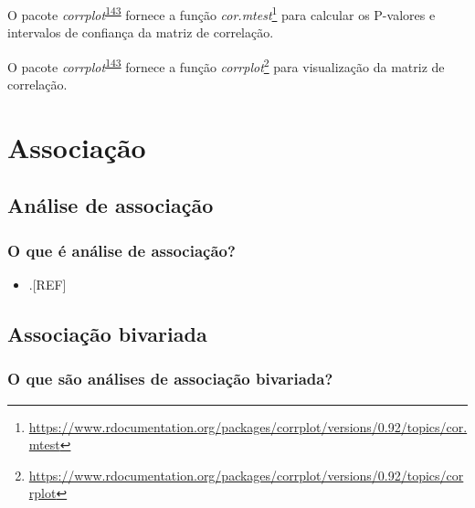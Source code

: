 \documentclass[
  a4paper,
]{book}
\providecommand{\tightlist}{%
  \setlength{\itemsep}{0pt}\setlength{\parskip}{0pt}}
\renewcommand{\href}[2]{#2\footnote{\url{#1}}}
\newenvironment{infobox}[1]
  {
  \begin{itemize}
  \renewcommand{\labelitemi}{
    \raisebox{-.7\height}[0pt][0pt]{
      {\setkeys{Gin}{width=3em,keepaspectratio}
        \texttt{[image: \#1]}}
    }
  }
  \setlength{\fboxsep}{1em}
  \begin{blackbox}
  \item
  }
  {
  \end{blackbox}
  \end{itemize}
  }
\begin{document}
\begin{infobox}{images/Rlogo}
O pacote \emph{corrplot}\textsuperscript{\protect\hyperlink{ref-corrplot-2}{143}} fornece a função \href{https://www.rdocumentation.org/packages/corrplot/versions/0.92/topics/cor.mtest}{\emph{cor.mtest}} para calcular os P-valores e intervalos de confiança da matriz de correlação.

\end{infobox}

\begin{infobox}{images/Rlogo}
O pacote \emph{corrplot}\textsuperscript{\protect\hyperlink{ref-corrplot-2}{143}} fornece a função \href{https://www.rdocumentation.org/packages/corrplot/versions/0.92/topics/corrplot}{\emph{corrplot}} para visualização da matriz de correlação.

\end{infobox}

\hypertarget{analise-inferencial-associacao}{%
\chapter{\texorpdfstring{\textbf{Associação}}{Associação}}\label{analise-inferencial-associacao}}

\hypertarget{analise-associacao}{%
\section{Análise de associação}\label{analise-associacao}}

\hypertarget{o-que-uxe9-anuxe1lise-de-associauxe7uxe3o}{%
\subsection{O que é análise de associação?}\label{o-que-uxe9-anuxe1lise-de-associauxe7uxe3o}}

\begin{itemize}
\tightlist
\item
  .{[}REF{]}
\end{itemize}

\hypertarget{bivariada}{%
\section{Associação bivariada}\label{bivariada}}

\hypertarget{o-que-suxe3o-anuxe1lises-de-associauxe7uxe3o-bivariada}{%
\subsection{O que são análises de associação bivariada?}\label{o-que-suxe3o-anuxe1lises-de-associauxe7uxe3o-bivariada}}
\end{document}
